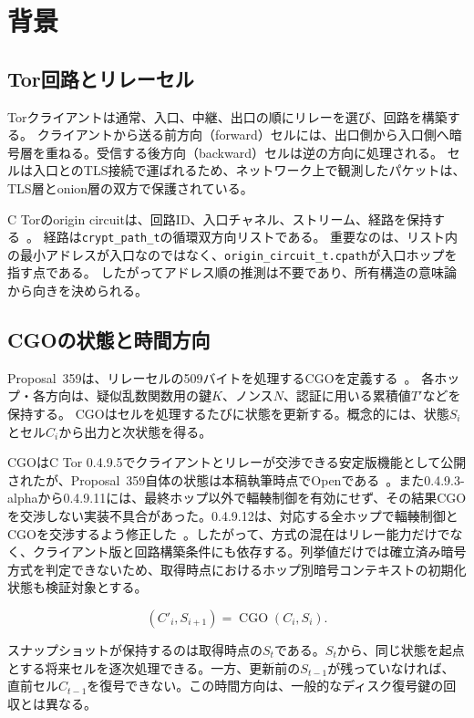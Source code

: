 \documentclass[10pt,a4paper]{ltjsarticle}
\newcommand{\code}[1]{\nolinkurl{#1}}
\begin{document}
\section{背景}\label{sec:background}

\subsection{Tor回路とリレーセル}

Torクライアントは通常、入口、中継、出口の順にリレーを選び、回路を構築する。
クライアントから送る前方向（forward）セルには、出口側から入口側へ暗号層を重ねる。受信する後方向（backward）セルは逆の方向に処理される。
セルは入口とのTLS接続で運ばれるため、ネットワーク上で観測したパケットは、TLS層とonion層の双方で保護されている。

C Torのorigin circuitは、回路ID、入口チャネル、ストリーム、経路を保持する~\cite{ctorsource04916}。
経路は\code{crypt_path_t}の循環双方向リストである。
重要なのは、リスト内の最小アドレスが入口なのではなく、\code{origin_circuit_t.cpath}が入口ホップを指す点である。
したがってアドレス順の推測は不要であり、所有構造の意味論から向きを決められる。

\subsection{CGOの状態と時間方向}

Proposal~359は、リレーセルの509バイトを処理するCGOを定義する~\cite{torproposal359}。
各ホップ・各方向は、疑似乱数関数用の鍵$K$、ノンス$N$、認証に用いる累積値$T'$などを保持する。
CGOはセルを処理するたびに状態を更新する。概念的には、状態$S_i$とセル$C_i$から出力と次状態を得る。

CGOはC Tor 0.4.9.5でクライアントとリレーが交渉できる安定版機能として公開されたが、Proposal~359自体の状態は本稿執筆時点でOpenである~\cite{torstable0495,torproposal359}。また0.4.9.3-alphaから0.4.9.11には、最終ホップ以外で輻輳制御を有効にせず、その結果CGOを交渉しない実装不具合があった。0.4.9.12は、対応する全ホップで輻輳制御とCGOを交渉するよう修正した~\cite{torrelease04912}。したがって、方式の混在はリレー能力だけでなく、クライアント版と回路構築条件にも依存する。列挙値だけでは確立済み暗号方式を判定できないため、取得時点におけるホップ別暗号コンテキストの初期化状態も検証対象とする。

\begin{equation}
  (C'_i, S_{i+1}) = \operatorname{CGO}(C_i,S_i).
\end{equation}

スナップショットが保持するのは取得時点の$S_t$である。$S_t$から、同じ状態を起点とする将来セルを逐次処理できる。一方、更新前の$S_{t-1}$が残っていなければ、直前セル$C_{t-1}$を復号できない。この時間方向は、一般的なディスク復号鍵の回収とは異なる。
\end{document}
